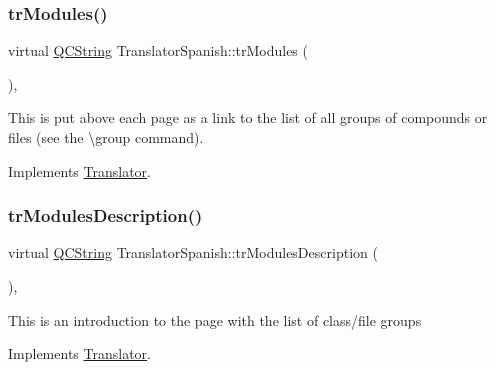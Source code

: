 \mbox{\label{class_translator_spanish_aa91d68c6f93b8ed6c3987cf89a822f5c}} 
\subsubsection{\texorpdfstring{trModules()}{trModules()}}
{\footnotesize\ttfamily virtual \mbox{\hyperlink{class_q_c_string}{Q\+C\+String}} Translator\+Spanish\+::tr\+Modules (\begin{DoxyParamCaption}{ }\end{DoxyParamCaption})\hspace{0.3cm}{\ttfamily [inline]}, {\ttfamily [virtual]}}

This is put above each page as a link to the list of all groups of compounds or files (see the \textbackslash{}group command). 

Implements \mbox{\hyperlink{class_translator}{Translator}}.

\mbox{\label{class_translator_spanish_a5ca7d1e7879c8bed86109fb9f27c05e8}} 
\subsubsection{\texorpdfstring{trModulesDescription()}{trModulesDescription()}}
{\footnotesize\ttfamily virtual \mbox{\hyperlink{class_q_c_string}{Q\+C\+String}} Translator\+Spanish\+::tr\+Modules\+Description (\begin{DoxyParamCaption}{ }\end{DoxyParamCaption})\hspace{0.3cm}{\ttfamily [inline]}, {\ttfamily [virtual]}}

This is an introduction to the page with the list of class/file groups 

Implements \mbox{\hyperlink{class_translator}{Translator}}.

\mbox{\label{class_translator_spanish_af5650f6cac37f78f43c272670f74da95}} 
